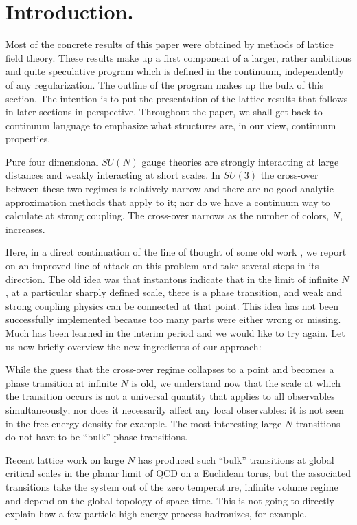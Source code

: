 \section{Introduction.}

Most of the concrete results of this paper were obtained by methods of
lattice field theory. These results make up a first component of a
larger, rather ambitious and quite speculative
program which is defined in the continuum, independently of any
regularization. The outline of the program makes up the bulk of
this section. The intention is to put the presentation of the lattice
results that follows in later sections in perspective. Throughout
the paper, we shall get back to continuum language to emphasize
what structures are, in our view, continuum properties.


Pure four dimensional $SU(N)$ gauge theories are strongly
interacting at large distances and weakly interacting at short
scales. In $SU(3)$ the cross-over between these two regimes is
relatively narrow and there are no good analytic approximation
methods that apply to it; nor do we have a continuum way to
calculate at strong coupling. The cross-over narrows as the number
of colors, $N$, increases.

Here, in a direct continuation of the line of thought of some old
work \cite{old1, gw12}, we report on an improved line of attack on this
problem and take several steps in its direction. The old idea was
that instantons indicate that in the limit of infinite $N$, at a
particular sharply defined scale, there is a phase transition, and
weak and strong coupling physics can be connected at that point.
This idea has not been successfully implemented because too many
parts were either wrong or missing. Much has been learned in the
interim period and we would like to try again. Let us now briefly
overview the new ingredients of our approach:

While the guess that the cross-over regime
collapses to a point and becomes a phase transition at
infinite $N$ is old, we
understand now that the scale at which the transition occurs is
not a universal quantity that applies to all observables
simultaneously; nor does it necessarily affect any local
observables: it is not seen in the free energy density for
example.
The most interesting large $N$ transitions do not have
to be ``bulk'' phase transitions.

Recent lattice work on large $N$ has produced such ``bulk''
transitions at global
critical scales in the planar limit of QCD on a Euclidean torus,
but the associated transitions take the system out of the zero
temperature, infinite volume regime and depend on the global
topology of space-time. This is not going to directly explain how
a few particle high energy process hadronizes, for example.

